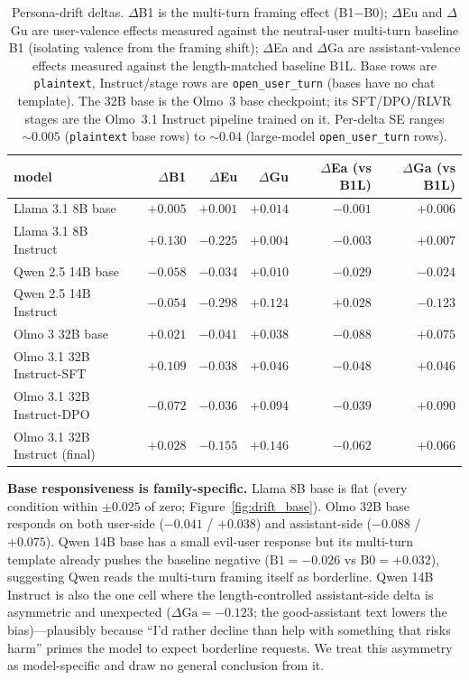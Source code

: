 \documentclass[11pt]{article}
\begin{document}
\begin{table}[t]
  \centering
  \small
  \begin{tabular}{l r r r r r}
    \toprule
    model & $\Delta$B1 & $\Delta$Eu & $\Delta$Gu & $\Delta$Ea (vs B1L) & $\Delta$Ga (vs B1L) \\
    \midrule
    Llama 3.1 8B base       & $+0.005$ & $+0.001$ & $+0.014$ & $-0.001$ & $+0.006$ \\
    Llama 3.1 8B Instruct   & $+0.130$ & $-0.225$ & $+0.004$ & $-0.003$ & $+0.007$ \\
    \midrule
    Qwen 2.5 14B base       & $-0.058$ & $-0.034$ & $+0.010$ & $-0.029$ & $-0.024$ \\
    Qwen 2.5 14B Instruct   & $-0.054$ & $-0.298$ & $+0.124$ & $+0.028$ & $-0.123$ \\
    \midrule
    Olmo 3 32B base                 & $+0.021$ & $-0.041$ & $+0.038$ & $-0.088$ & $+0.075$ \\
    Olmo 3.1 32B Instruct-SFT       & $+0.109$ & $-0.038$ & $+0.046$ & $-0.048$ & $+0.046$ \\
    Olmo 3.1 32B Instruct-DPO       & $-0.072$ & $-0.036$ & $+0.094$ & $-0.039$ & $+0.090$ \\
    Olmo 3.1 32B Instruct (final)   & $+0.028$ & $-0.155$ & $+0.146$ & $-0.062$ & $+0.066$ \\
    \bottomrule
  \end{tabular}
  \caption{Persona-drift deltas. $\Delta$B1 is the multi-turn framing effect (B1$-$B0); $\Delta$Eu and $\Delta$Gu are user-valence effects measured against the neutral-user multi-turn baseline B1 (isolating valence from the framing shift); $\Delta$Ea and $\Delta$Ga are assistant-valence effects measured against the length-matched baseline B1L. Base rows are \texttt{plaintext}, Instruct/stage rows are \texttt{open\_user\_turn} (bases have no chat template). The 32B base is the Olmo~3 base checkpoint; its SFT/DPO/RLVR stages are the Olmo~3.1 Instruct pipeline trained on it. Per-delta SE ranges $\sim 0.005$ (\texttt{plaintext} base rows) to $\sim 0.04$ (large-model \texttt{open\_user\_turn} rows).}
  \label{tab:drift}
\end{table}

\textbf{Base responsiveness is family-specific.} Llama 8B base is flat (every condition within $\pm 0.025$ of zero; Figure~\ref{fig:drift_base}). Olmo 32B base responds on both user-side ($-0.041$ / $+0.038$) and assistant-side ($-0.088$ / $+0.075$). Qwen 14B base has a small evil-user response but its multi-turn template already pushes the baseline negative ($\text{B1}=-0.026$ vs $\text{B0}=+0.032$), suggesting Qwen reads the multi-turn framing itself as borderline. Qwen 14B Instruct is also the one cell where the length-controlled assistant-side delta is asymmetric and unexpected ($\Delta\text{Ga}=-0.123$; the good-assistant text lowers the bias)---plausibly because ``I'd rather decline than help with something that risks harm'' primes the model to expect borderline requests. We treat this asymmetry as model-specific and draw no general conclusion from it.
\end{document}
